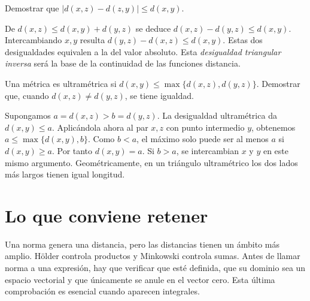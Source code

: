 \begin{ejercicio}
Demostrar que $|d(x,z)-d(z,y)|\le d(x,y)$.
\end{ejercicio}
\begin{solucion}
De $d(x,z)\le d(x,y)+d(y,z)$ se deduce $d(x,z)-d(y,z)\le d(x,y)$. Intercambiando $x,y$ resulta $d(y,z)-d(x,z)\le d(x,y)$. Estas dos desigualdades equivalen a la del valor absoluto. Esta \emph{desigualdad triangular inversa} será la base de la continuidad de las funciones distancia.
\end{solucion}

\begin{ejercicio}
Una métrica es ultramétrica si $d(x,y)\le\max\{d(x,z),d(y,z)\}$. Demostrar que, cuando $d(x,z)\ne d(y,z)$, se tiene igualdad.
\end{ejercicio}
\begin{solucion}
Supongamos $a=d(x,z)>b=d(y,z)$. La desigualdad ultramétrica da $d(x,y)\le a$. Aplicándola ahora al par $x,z$ con punto intermedio $y$, obtenemos $a\le\max\{d(x,y),b\}$. Como $b<a$, el máximo solo puede ser al menos $a$ si $d(x,y)\ge a$. Por tanto $d(x,y)=a$. Si $b>a$, se intercambian $x$ y $y$ en este mismo argumento. Geométricamente, en un triángulo ultramétrico los dos lados más largos tienen igual longitud.
\end{solucion}

\section{Lo que conviene retener}
Una norma genera una distancia, pero las distancias tienen un ámbito más amplio. Hölder controla productos y Minkowski controla sumas. Antes de llamar norma a una expresión, hay que verificar que esté definida, que su dominio sea un espacio vectorial y que únicamente se anule en el vector cero. Esta última comprobación es esencial cuando aparecen integrales.
